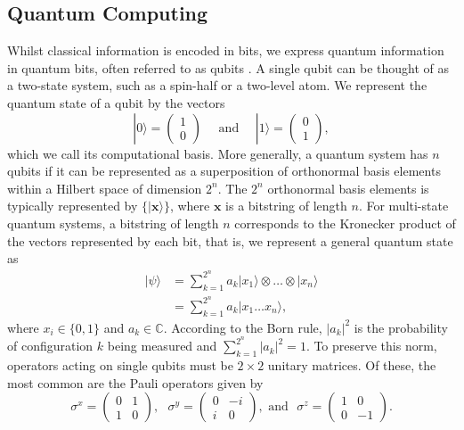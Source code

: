 \subsection{Quantum Computing}

    Whilst classical information is encoded in bits, we express quantum information in quantum bits, often referred to as qubits \cite{schumacher1995quantum}. A single qubit can be thought of as a two-state system, such as a spin-half or a two-level atom. We represent the quantum state of a qubit by the vectors 
    $$|0\rangle=\begin{pmatrix}1\\0\end{pmatrix} \quad \text{ and } \quad |1\rangle = \begin{pmatrix}0\\1\end{pmatrix},$$
    which we call its computational basis. More generally, a quantum system has $n$ qubits if it can be represented as a superposition of orthonormal basis elements within a Hilbert space of dimension $2^n$. The $2^n$ orthonormal basis elements is typically represented by $\{|\mathbf{x}\rangle\}$, where $\mathbf{x}$ is a bitstring of length $n$. For multi-state quantum systems, a bitstring of length $n$ corresponds to the Kronecker product of the vectors represented by each bit, that is, we represent a general quantum state as
    \begin{align}
        |\psi\rangle &= \sum^{2^n}_{k=1}a_k|x_1\rangle \otimes\dots\otimes|x_n\rangle \nonumber \\
        &= \sum^{2^n}_{k=1}a_k|x_1\dots x_n\rangle,
    \end{align}
    where $x_i\in \{0,1\}$ and $a_k\in \mathbb{C}$. According to the Born rule, $|a_k|^2$ is the probability of configuration $k$ being measured and $\sum^{2^n}_{k=1}|a_k|^2=1$. To preserve this norm, operators acting on single qubits must be $2\times2$ unitary matrices. Of these, the most common are the Pauli operators given by 
    \begin{equation}\sigma^x = \begin{pmatrix} 0 & 1 \\ 1 & 0 \end{pmatrix}, \, \, \, \, \sigma^y = \begin{pmatrix} 0 & -i \\ i & 0 \end{pmatrix}, \text{ and} \, \, \, \, \sigma^z = \begin{pmatrix} 1 & 0 \\ 0 & -1\end{pmatrix}.\end{equation}

